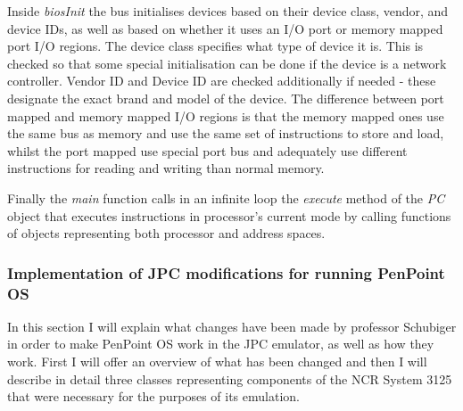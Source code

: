 
Inside \emph{biosInit} the bus initialises devices based on their device class,
vendor, and device IDs, as well as based on whether it uses an I/O port or memory
mapped port I/O regions. The device class specifies what type of device it is.
This is checked so that some special initialisation can be done if the device
is a network controller. Vendor ID and Device ID are checked additionally if
needed - these designate the exact brand and model of the device. The
difference between port mapped and memory mapped I/O regions is that the memory
mapped ones use the same bus as memory and use the same set of instructions to
store and load, whilst the port mapped use special port bus and adequately use
different instructions for reading and writing than normal memory.

Finally the \emph{main} function calls in an infinite loop the \emph{execute}
method of the \emph{PC} object that executes instructions in processor's
current mode by calling functions of objects representing both processor and
address spaces.

\subsubsection{Implementation of JPC modifications for running PenPoint OS}

In this section I will explain what changes have been made by professor
Schubiger in order to make PenPoint OS work in the JPC emulator, as well as how
they work. First I will offer an overview of what has been changed and then
I will describe in detail three classes representing components of the NCR
System 3125 that were necessary for the purposes of its emulation.

